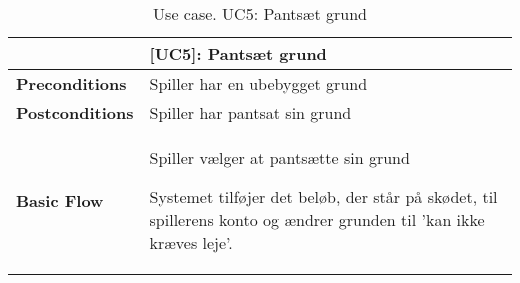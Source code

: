 \documentclass[class=article, crop=false]{standalone}
\begin{document}
    \begin{table}[H]
        \caption{Use case. UC5: Pantsæt grund}
        \begin{tabularx}{\textwidth}{|l|X|}
            \hline
            & \textbf{[UC5]: Pantsæt grund}   \\ \hline
            \textbf{Preconditions}       & Spiller har en ubebygget grund\\ \hline
            \textbf{Postconditions}      & Spiller har pantsat sin grund\\ \hline


            \textbf{Basic Flow} & \begin{tabenum}
                                      \item Spiller vælger at pantsætte sin grund
                                      \item Systemet tilføjer det beløb, der står på skødet, til spillerens konto og ændrer grunden til 'kan ikke kræves leje'.
            \end{tabenum}   \\ \hline



        \end{tabularx}


    \end{table}
\end{document}
